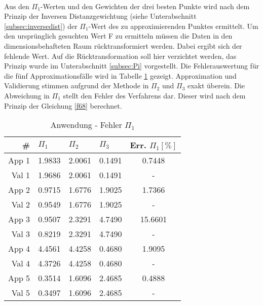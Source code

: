 \parskip 12pt \\
Aus den $\Pi_1$-Werten und den Gewichten der drei besten Punkte wird nach dem Prinzip der Inversen Distanzgewichtung (siehe Unterabschnitt \ref{subsec:inversedist}) der $\Pi_1$-Wert des zu approximierenden Punktes ermittelt. Um den ursprünglich gesuchten Wert F zu ermitteln müssen die Daten in den dimensionsbehafteten Raum rücktransformiert werden. Dabei ergibt sich der fehlende Wert. Auf die Rücktransformation soll hier verzichtet werden, das Prinzip wurde im Unterabschnitt \ref{subsec:Pi} vorgestellt. Die Fehlerauswertung für die fünf Approximationsfälle wird in Tabelle \ref{tab:anwFehler} gezeigt. Approximation und Validierung stimmen aufgrund der Methode in $\Pi_2$ und $\Pi_3$ exakt überein. Die Abweichung in $\Pi_1$ stellt den Fehler des Verfahrens dar. Dieser wird nach dem Prinzip der Gleichung \eqref{f68} berechnet.

\begin{table}[H]
\centering %

\begin{tabular}{|r|l|l|l|c|}
\hline \hline
\#       & $\Pi_1$ & $\Pi_2$ & $\Pi_3$ & Err. $\Pi_1 [\%]$ \\ \hline \hline
App 1 &    1.9833  &  2.0061  &  0.1491    &     0.7448              \\ \hline
Val 1    &    1.9686  &  2.0061  &  0.1491    &       -        \\ \hline\hline
App 2 &      0.9715  &  1.6776  &  1.9025        &    1.7366           \\ \hline
Val 2    &        0.9549  &  1.6776  &  1.9025       &      -         \\ \hline \hline
App 3 &     0.9507  &  2.3291  &  4.7490       &    15.6601           \\ \hline
Val 3    &         0.8219  &  2.3291 &   4.7490       &       -        \\ \hline \hline
App 4 &      4.4561 &   4.4258   & 0.4680      &    1.9095           \\ \hline
Val 4    &        4.3726  &  4.4258  &  0.4680       &       -        \\ \hline \hline
App 5 &        0.3514 &   1.6096  &  2.4685        &    0.4888           \\ \hline
Val 5    &        0.3497  &  1.6096  &  2.4685        &       -        \\ \hline
\end{tabular}
\caption[Anwendung - Fehler]{Anwendung - Fehler $\Pi_1$} %
\label{tab:anwFehler}
\end{table}

